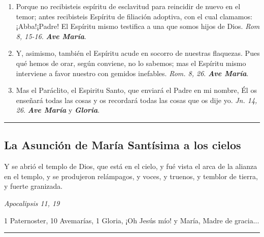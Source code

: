 \documentclass[11pt,a4paper]{book}
\begin{document}
\begin{enumerate}
        \item Porque no recibisteis espíritu de esclavitud para reincidir de nuevo en el temor; antes recibisteis Espíritu de filiación adoptiva, con el cual clamamos: ¡Abba!¡Padre! 
            El Espíritu mismo testifica a una que somos hijos de Dios. \emph{Rom 8, 15-16}. \textbf{\emph{Ave María}}.

        \item Y, asimismo, también el Espíritu acude en socorro de nuestras flaquezas. Pues qué hemos de orar, según conviene, no lo sabemos; mas el Espíritu mismo interviene a 
            favor nuestro con gemidos inefables. \emph{Rom. 8, 26}. \textbf{\emph{Ave María}}.

        \item Mas el Paráclito, el Espiritu Santo, que enviará el Padre en mi nombre, Él os enseñará todas las cosas y os recordará todas las cosas que os dije yo. 
            \emph{Jn. 14, 26}. \textbf{\emph{Ave María}} y \textbf{\emph{Gloria}}.

    \end{enumerate}    

    \rule{\textwidth}{0.5pt}
    

    \subsection*{La Asunción de María Santísima a los cielos}

    Y se abrió el templo de Dios, que está en el cielo, y fué vista el arca de la alianza en el templo, 
    y se produjeron relámpagos, y voces, y truenos, y temblor de tierra, y fuerte granizada. 

    \begin{flushright}
        \emph{Apocalipsis 11, 19}
    \end{flushright}    

    1 Paternoster, 10 Avemarías, 1 Gloria, ¡Oh Jesús mío! y María, Madre de gracia...

    \rule{\textwidth}{0.5pt}
\end{document}
